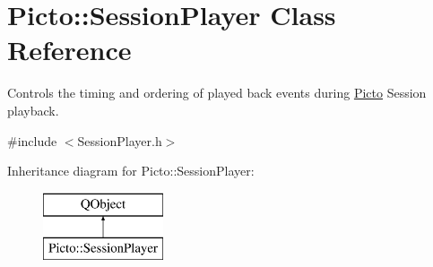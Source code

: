 \hypertarget{class_picto_1_1_session_player}{\section{Picto\-:\-:Session\-Player Class Reference}
\label{class_picto_1_1_session_player}
}


Controls the timing and ordering of played back events during \hyperlink{namespace_picto}{Picto} Session playback.  




{\ttfamily \#include $<$Session\-Player.\-h$>$}

Inheritance diagram for Picto\-:\-:Session\-Player\-:\begin{figure}[H]
\begin{center}
\leavevmode
\includegraphics[height=2.000000cm]{class_picto_1_1_session_player}
\end{center}
\end{figure}
